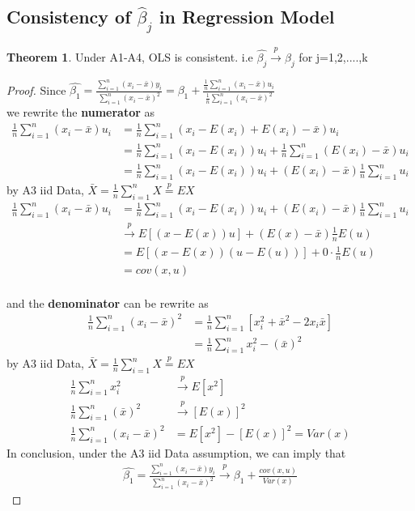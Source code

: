 \documentclass{article}
\theoremstyle{definition}
\theoremstyle{thrm}
\newtheorem{thrm}{Theorem}[section]
\theoremstyle{lma}
\theoremstyle{ppst}
\theoremstyle{crlr}
\begin{document}
\subsection{Consistency of $\hat{\beta}_j$ in Regression Model}
\begin{thrm}
	Under A1-A4, OLS is consistent. i.e $\hat{\beta_j}\stackrel{p}{\to} \beta_j$ for j=1,2,....,k
\end{thrm}
\begin{proof}
	Since $\hat{\beta_1} = \frac{\sum_{i=1}^n(x_i-\bar{x})y_i}{\sum_{i=1}^n(x_i-\bar{x})^2} = \beta_1 + \frac{\frac{1}{n}\sum_{i=1}^n(x_i-\bar{x})u_i}{\frac{1}{n}\sum_{i=1}^n(x_i-\bar{x})^2}$\\
we rewrite the \textbf{numerator} as
\begin{align*}
	\frac{1}{n}\sum_{i=1}^n(x_i-\bar{x})u_i &= \frac{1}{n}\sum_{i=1}^n(x_i-E(x_i)+E(x_i)-\bar{x})u_i \\
	&= \frac{1}{n}\sum_{i=1}^n(x_i-E(x_i))u_i + \frac{1}{n}\sum_{i=1}^n(E(x_i)-\bar{x})u_i\\
	&= \frac{1}{n}\sum_{i=1}^n(x_i-E(x_i))u_i + (E(x_i)-\bar{x})\frac{1}{n}\sum_{i=1}^nu_i
\end{align*}
by A3 iid Data, $\bar{X} = \frac{1}{n}\sum_{i=1}^nX \stackrel{p}{=} EX$
\begin{align*}
	\frac{1}{n}\sum_{i=1}^n(x_i-\bar{x})u_i &=\frac{1}{n}\sum_{i=1}^n(x_i-E(x_i))u_i + (E(x_i)-\bar{x})\frac{1}{n}\sum_{i=1}^nu_i\\
	&\stackrel{p}{\to}E[(x-E(x))u]+(E(x)-\bar{x})\frac{1}{n}E(u)\\
	&= E[(x-E(x))(u-E(u))] + 0 \cdot \frac{1}{n}E(u)\\
	&=cov(x,u)
\end{align*}\\
and the \textbf{denominator} can be rewrite as
\begin{align*}
	\frac{1}{n}\sum_{i=1}^n(x_i-\bar{x})^2 &= \frac{1}{n}\sum_{i=1}^n[x_i^2+\bar{x}^2-2x_i\bar{x}]\\
	&= \frac{1}{n}\sum_{i=1}^nx_i^2-(\bar{x})^2
\end{align*}
by A3 iid Data, $\bar{X} = \frac{1}{n}\sum_{i=1}^nX \stackrel{p}{=} EX$
\begin{align*}
	\frac{1}{n}\sum_{i=1}^nx_i^2 &\stackrel{p}{\to} E[x^2]\\
	\frac{1}{n}\sum_{i=1}^n(\bar{x})^2 &\stackrel{p}{\to} [E(x)]^2\\
	\frac{1}{n}\sum_{i=1}^n(x_i-\bar{x})^2 &=E[x^2]-[E(x)]^2 = Var(x)
\end{align*}
In conclusion, under the A3 iid Data assumption, we can imply that
\begin{align*}
	\hat{\beta_1} = \frac{\sum_{i=1}^n(x_i-\bar{x})y_i}{\sum_{i=1}^n(x_i-\bar{x})^2} \stackrel{p}{\to} \beta_1 +\frac{cov(x,u)}{Var(x)}
\end{align*}
\end{proof}
\end{document}
